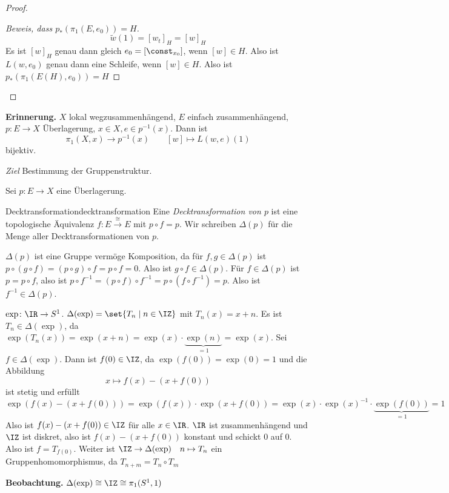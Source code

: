 \documentclass[language=ngerman]{TemplateLecture} %
\begin{document}
\begin{proof}
\begin{description}
\begin{description}
\begin{enumerate}
\begin{proof}[Beweis, dass \(p_*(\pi_1(E,e_0)) = H\)]
                \[\tilde w(1) = [w_t]_H = [w]_H\]
                Es ist \([w]_H\) genau dann gleich \(e_0 = [\const_{x_0}]\), wenn \([w] \in H\). Also ist \(L(w, e_0)\) genau dann eine Schleife, wenn \([w] \in H\). Also ist \(p_*(\pi_1(E(H), e_0)) = H\)
                \end{proof}
            \end{enumerate}
        \end{description}   
    \end{description}
\end{proof}

\textbf{Erinnerung.} \(X\) lokal wegzusammenhängend, \(E\) einfach zusammenhängend, \(p\colon E\to X\) Überlagerung, \(x \in X, e\in p^{-1}(x)\). Dann ist
\[\pi_1(X,x) \to p^{-1}(x) \qquad [w] \mapsto L(w,e)(1)\]
bijektiv.

\emph{Ziel} Bestimmung der Gruppenstruktur.

Sei \(p \colon E \to X\) eine Überlagerung.

\begin{defi}{Decktransformation}{decktransformation}
    Eine \emph{Decktransformation von \(p\)} ist eine topologische Äquivalenz \(f \colon E \xrightarrow{\cong} E\) mit \(p \circ f = p\). Wir schreiben \(\Delta(p)\) für die Menge aller Decktransformationen von \(p\).
\end{defi}

\(\Delta(p)\) ist eine Gruppe vermöge Komposition, da für \(f,g \in \Delta(p)\) ist \(p \circ (g\circ f) = (p\circ g) \circ f = p \circ f = 0\). Also ist \(g\circ f \in \Delta(p)\). Für \(f \in \Delta(p)\) ist \(p = p \circ f\), also ist \(p\circ f^{-1} = (p\circ f) \circ f^{-1} = p\circ (f\circ f^{-1}) = p\). Also ist \(f^{-1} \in \Delta(p)\).

\begin{example}
    \(\exp\colon \IR \to S^1\). \(\Delta(\exp) = \set{T_n \mid n \in \IZ}\) mit \(T_n(x) = x+ n\). Es ist \(T_n \in \Delta(\exp)\), da \(\exp(T_n(x)) = \exp(x+n) = \exp(x) \cdot \underbrace{\exp(n)}_{= 1} = \exp(x)\). Sei \(f \in \Delta(\exp)\). Dann ist \(f(0) \in \IZ\), da \(\exp(f(0)) = \exp(0) = 1\) und die Abbildung
    \[x \mapsto f(x) - (x + f(0))\]
    ist stetig und erfüllt
    \[\exp(f(x) - (x+f(0))) = \exp(f(x)) \cdot \exp(x+f(0)) = \exp(x) \cdot \exp(x)^{-1} \cdot \underbrace{\exp(f(0))}_{= 1} = 1 \]
    Also ist \(f(x) - (x + f(0)) \in \IZ\) für alle \(x \in \IR\). \(\IR\) ist zusammenhängend und \(\IZ\) ist diskret, also ist \(f(x) - (x +f(0))\) konstant und schickt \(0\) auf \(0\). Also ist \(f = T_{f(0)}\).
    Weiter ist \(\IZ \to \Delta(\exp)\quad n \mapsto T_n\) ein Gruppenhomomorphismus, da \(T_{n+m} = T_n \circ T_m\)

    \textbf{Beobachtung.} \(\Delta(\exp) \cong \IZ \cong \pi_1(S^1, 1)\)
\end{example}
\end{document}

